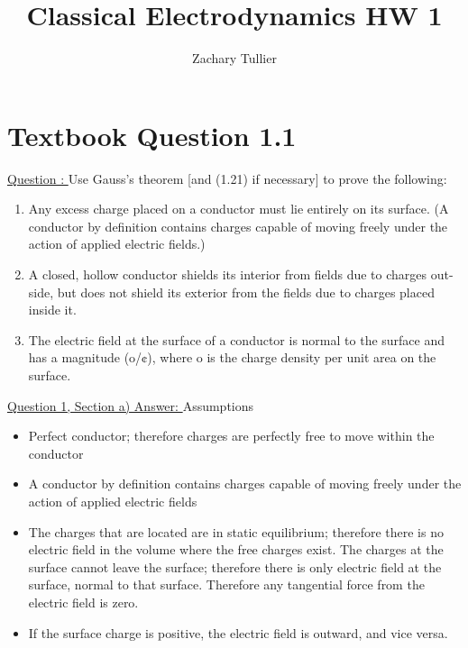 \documentclass[English]{article}
\begin{document}
\title{Classical Electrodynamics HW 1}

\author[1]{Zachary Tullier}

\maketitle


\section{Textbook Question 1.1} \label{section1}
    \underline{Question : }
    \newline Use Gauss’s theorem [and (1.21) if necessary] to prove the following:
    \begin{enumerate}
        \item [a)] Any excess charge placed on a conductor must lie entirely on its surface. (A conductor by definition contains charges capable of moving freely under the action of applied electric fields.)
        \item [b)] A closed, hollow conductor shields its interior from fields due to charges out-side, but does not shield its exterior from the fields due to charges placed inside it.
        \item [c)] The electric field at the surface of a conductor is normal to the surface and has a magnitude (o/¢), where o is the charge density per unit area on the surface.
    \end{enumerate}

    \newpage
    \underline{Question 1, Section a) Answer: }
    \newline 
    \newline Assumptions
    \begin{itemize}
        \item Perfect conductor; therefore charges are perfectly free to move within the conductor
        \item A conductor by definition contains charges capable of moving freely under the action of applied electric fields
        \item The charges that are located are in static equilibrium; therefore there is no electric field in the volume where the free charges exist. The charges at the surface cannot leave the surface; therefore there is only electric field at the surface, normal to that surface. Therefore any tangential force from the electric field is zero. 
        \item If the surface charge is positive, the electric field is outward, and vice versa.     
    \end{itemize}
    
\end{document}
